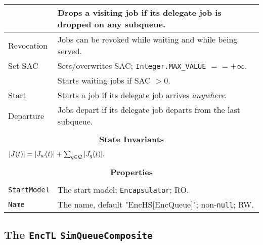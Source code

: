 \begin{tabular}{|l|l|}
	& Drops a visiting job if its delegate job is dropped on any subqueue. \\
	\hline
	Revocation & Jobs can be revoked while waiting and while being served. \\
	\hline
	Set SAC & Sets/overwrites SAC; \lstinline|Integer.MAX_VALUE| $== +\infty$. \\
	& Starts waiting jobs if SAC $> 0$. \\
	\hline
	Start & Starts a job if its delegate job arrives {\em anywhere}. \\
	\hline
	Departure & Jobs depart if its delegate job departs from the last subqueue. \\
	\hline
	\multicolumn{2}{|c|}{} \\
	\multicolumn{2}{|c|}{\bf State  Invariants} \\
	\multicolumn{2}{|c|}{} \\
	\hline
	\multicolumn{2}{|l|}{$|J(t)| = |J_{w}(t)| + \sum_{q \in \cal{Q}} |J_{q}(t)|.$} \\
	\hline
	\multicolumn{2}{|c|}{} \\
	\multicolumn{2}{|c|}{\bf Properties} \\
	\multicolumn{2}{|c|}{} \\
	\hline
	\lstinline|StartModel|    & The start model; \lstinline|Encapsulator|; RO. \\
	\hline
	\lstinline|Name|          & The name, default "EncHS[EncQueue]"; non-\lstinline|null|; RW. \\
	\hline
\end{tabular}

\subsection{The \lstinline{EncTL} \lstinline{SimQueueComposite}}
\label{sec:EncTL}

